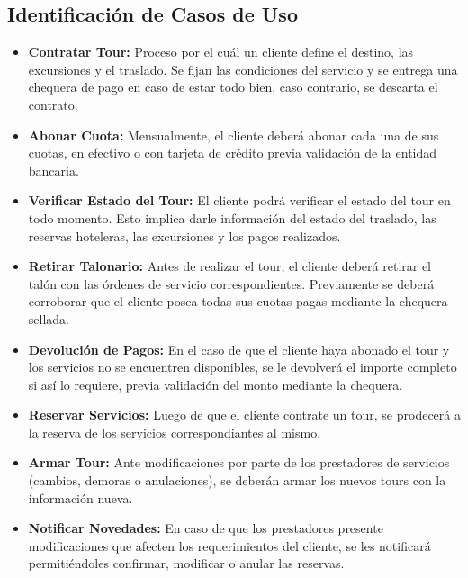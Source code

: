 \documentclass[12pt,a4paper]{article}
\begin{document}
	\subsection{Identificación de Casos de Uso}
		\begin{itemize}
			\item \textbf{Contratar Tour:} Proceso por el cuál un cliente define el destino, las excursiones y el traslado. Se fijan las condiciones del servicio y se entrega una chequera de pago en caso de estar todo bien, caso contrario, se descarta el contrato.

			\item \textbf{Abonar Cuota:} Mensualmente, el cliente deberá abonar cada una de sus cuotas, en efectivo o con tarjeta de crédito previa validación de la entidad bancaria. 

			\item \textbf{Verificar Estado del Tour:} El cliente podrá verificar el estado del tour en todo momento. Esto implica darle información del estado del traslado, las reservas hoteleras, las excursiones y los pagos realizados.

			\item \textbf{Retirar Talonario:} Antes de realizar el tour, el cliente deberá retirar el talón con las órdenes de servicio correspondientes. Previamente se deberá corroborar que el cliente posea todas sus cuotas pagas mediante la chequera sellada.

			\item \textbf{Devolución de Pagos:} En el caso de que el cliente haya abonado el tour y los servicios no se encuentren disponibles, se le devolverá el importe completo si así lo requiere, previa validación del monto mediante la chequera.

			\item \textbf{Reservar Servicios:} Luego de que el cliente contrate un tour, se prodecerá a la reserva de los servicios correspondiantes al mismo.

			\item \textbf{Armar Tour:} Ante modificaciones por parte de los prestadores de servicios (cambios, demoras o anulaciones), se deberán armar los nuevos tours con la información nueva.

			\item \textbf{Notificar Novedades:} En caso de que los prestadores presente modificaciones que afecten los requerimientos del cliente, se les notificará permitiéndoles confirmar, modificar o anular las reservas.


\end{itemize}
\end{document}
